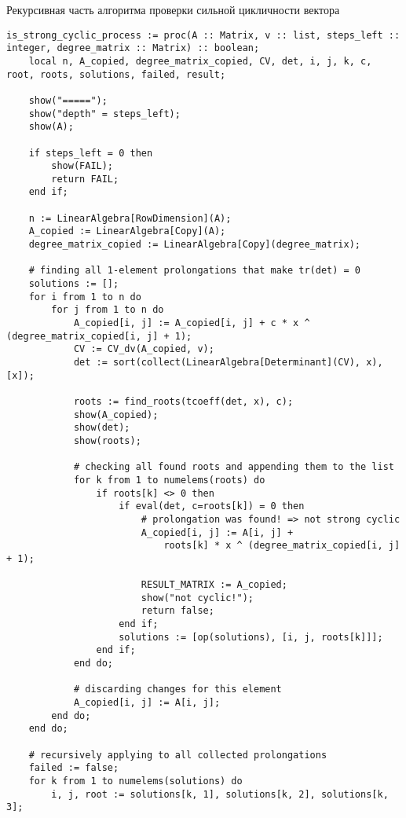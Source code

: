 Рекурсивная часть алгоритма проверки сильной цикличности вектора
\begin{lstlisting}[basicstyle=\scriptsize]
is_strong_cyclic_process := proc(A :: Matrix, v :: list, steps_left :: integer, degree_matrix :: Matrix) :: boolean;
    local n, A_copied, degree_matrix_copied, CV, det, i, j, k, c, root, roots, solutions, failed, result;

    show("=====");
    show("depth" = steps_left);
    show(A);
    
    if steps_left = 0 then
        show(FAIL);
        return FAIL;
    end if;
    
    n := LinearAlgebra[RowDimension](A);
    A_copied := LinearAlgebra[Copy](A);
    degree_matrix_copied := LinearAlgebra[Copy](degree_matrix);
    
    # finding all 1-element prolongations that make tr(det) = 0
    solutions := [];
    for i from 1 to n do
        for j from 1 to n do
            A_copied[i, j] := A_copied[i, j] + c * x ^ (degree_matrix_copied[i, j] + 1);
            CV := CV_dv(A_copied, v);
            det := sort(collect(LinearAlgebra[Determinant](CV), x), [x]);
            
            roots := find_roots(tcoeff(det, x), c);
            show(A_copied);
            show(det);
            show(roots);
            
            # checking all found roots and appending them to the list
            for k from 1 to numelems(roots) do
                if roots[k] <> 0 then
                    if eval(det, c=roots[k]) = 0 then
                        # prolongation was found! => not strong cyclic
                        A_copied[i, j] := A[i, j] +
                            roots[k] * x ^ (degree_matrix_copied[i, j] + 1);
                        
                        RESULT_MATRIX := A_copied;
                        show("not cyclic!");
                        return false;
                    end if;
                    solutions := [op(solutions), [i, j, roots[k]]];
                end if;
            end do;
            
            # discarding changes for this element
            A_copied[i, j] := A[i, j];
        end do;
    end do;
    
    # recursively applying to all collected prolongations
    failed := false;
    for k from 1 to numelems(solutions) do
        i, j, root := solutions[k, 1], solutions[k, 2], solutions[k, 3];
        

\end{lstlisting}
